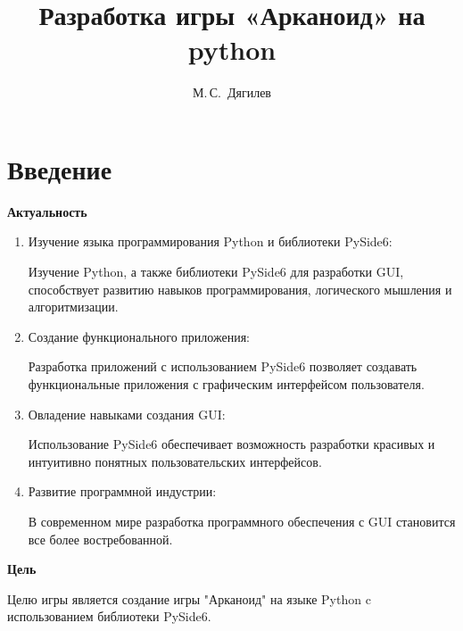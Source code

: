 \documentclass[14pt, oneside]{altsu-report}
\title{Разработка игры «Арканоид» на python}
\author{М.\,С.~Дягилев}
\institute{Институт цифровых технологий, электроники и физики}
\date{\the\year}
\begin{document}
\maketitle

\setcounter{page}{2}
\makeabstract
\tableofcontents

\chapter*{Введение}

\textbf{Актуальность} 
\begin{enumerate}

\item Изучение языка программирования Python и библиотеки PySide6:

Изучение Python, а также библиотеки PySide6 для разработки GUI, способствует развитию навыков программирования, логического мышления и алгоритмизации. 

\item Создание функционального приложения:

Разработка приложений с использованием PySide6 позволяет создавать функциональные приложения с графическим интерфейсом пользователя.

\item Овладение навыками создания GUI:

Использование PySide6 обеспечивает возможность разработки красивых и интуитивно понятных пользовательских интерфейсов. 

\item Развитие программной индустрии:

В современном мире разработка программного обеспечения с GUI становится все более востребованной.
\end{enumerate}

\textbf{Цель}

Целю игры является создание игры "Арканоид" на языке Python c использованием библиотеки PySide6.
\end{document}
